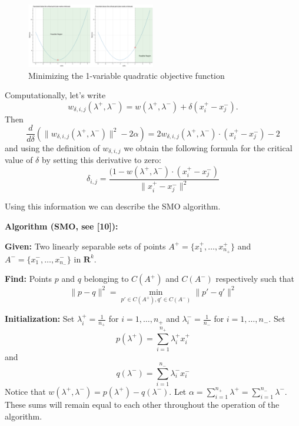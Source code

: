 \documentclass[
  11pt,
  letterpaper,
]{scrbook}
\theoremstyle{plain}
\theoremstyle{plain}
\theoremstyle{remark}
\begin{document}
\begin{figure}

{\centering \includegraphics[width=0.5\textwidth,height=\textheight]{chapters/img/quadratic.png}

}

\caption{\label{fig-quadratics}Minimizing the 1-variable quadratic
objective function}

\end{figure}

Computationally, let's write \[
w_{\delta,i,j}(\lambda^{+},\lambda^{-}) = w(\lambda^{+},\lambda^{-})+\delta(x^{+}_{i}-x^{-}_{j}).
\] Then \[
\frac{d}{d\delta}(\|w_{\delta,i,j}(\lambda^{+},\lambda^{-})\|^2-2\alpha)  = 2w_{\delta,i,j}(\lambda^{+},\lambda^{-})\cdot(x^{+}_{i}-x^{-}_{j})-2
\] and using the definition of \(w_{\delta,i,j}\) we obtain the
following formula for the critical value of \(\delta\) by setting this
derivative to zero: \[
\delta_{i,j} = \frac{(1-w(\lambda^{+},\lambda^{-})\cdot(x_{i}^{+}-x_{j}^{-})}{\|x^+_{i}-x^{-}_{j}\|^2}
\]

Using this information we can describe the SMO algorithm.

\textbf{Algorithm (SMO, see {[}10{]}):}

\textbf{Given:} Two linearly separable sets of points
\(A^{+}=\{x_{1}^{+},\ldots,x_{n_{+}}^{+}\}\) and
\(A^{-}=\{x_{1}^{-},\ldots, x_{n_{-}}^{-}\}\) in \(\mathbf{R}^{k}\).

\textbf{Find:} Points \(p\) and \(q\) belonging to \(C(A^{+})\) and
\(C(A^{-})\) respectively such that \[
\|p-q\|^2=\min_{p'\in C(A^{+}),q'\in C(A^{-})} \|p'-q'\|^2
\]

\textbf{Initialization:} Set \(\lambda_{i}^{+}=\frac{1}{n_{+}}\) for
\(i=1,\ldots, n_{+}\) and \(\lambda_{i}^{-}=\frac{1}{n_{-}}\) for
\(i=1,\ldots, n_{-}\). Set \[
p(\lambda^{+})=\sum_{i=1}^{n_{+}}\lambda^{+}_{i}x^{+}_{i}
\] and \[
q(\lambda^{-})=\sum_{i=1}^{n_{-}}\lambda^{-}_{i}x^{-}_{i}
\] Notice that
\(w(\lambda^{+},\lambda^{-})=p(\lambda^{+})-q(\lambda^{-})\). Let
\(\alpha=\sum_{i=1}^{n_{+}}\lambda^{+}=\sum_{i=1}^{n_{-}}\lambda^{-}\).
These sums will remain equal to each other throughout the operation of
the algorithm.
\end{document}
